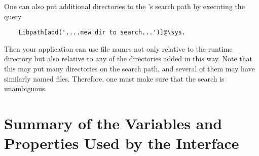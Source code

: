 One can also put additional directories to the \FLSYSTEM's search path by
executing the query
\begin{verbatim}
    Libpath[add('....new dir to search...')]@\sys.
\end{verbatim}
Then your application can use file names not only relative to the runtime
directory but also relative to any of the directories added in this way.
Note that this may put many directories on the search path, and
several of them may have similarly named files. Therefore,
one must make sure that the search is unambiguous.


\section{Summary of the Variables and Properties Used by the Interface}

